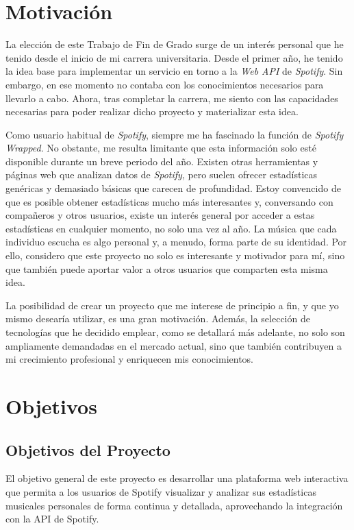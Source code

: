 \section{Motivación}

La elección de este Trabajo de Fin de Grado surge de un interés personal que he tenido desde el inicio de mi carrera universitaria. Desde el primer año, he tenido la idea base para implementar un servicio en torno a la \textit{Web API} de \textit{Spotify}. Sin embargo, en ese momento no contaba con los conocimientos necesarios para llevarlo a cabo. Ahora, tras completar la carrera, me siento con las capacidades necesarias para poder realizar dicho proyecto y materializar esta idea.

Como usuario habitual de \textit{Spotify}, siempre me ha fascinado la función de \textit{Spotify Wrapped}. No obstante, me resulta limitante que esta información solo esté disponible durante un breve periodo del año. Existen otras herramientas y páginas web que analizan datos de \textit{Spotify}, pero suelen ofrecer estadísticas genéricas y demasiado básicas que carecen de profundidad. Estoy convencido de que es posible obtener estadísticas mucho más interesantes y, conversando con compañeros y otros usuarios, existe un interés general por acceder a estas estadísticas en cualquier momento, no solo una vez al año. La música que cada individuo escucha es algo personal y, a menudo, forma parte de su identidad. Por ello, considero que este proyecto no solo es interesante y motivador para mí, sino que también puede aportar valor a otros usuarios que comparten esta misma idea.

La posibilidad de crear un proyecto que me interese de principio a fin, y que yo mismo desearía utilizar, es una gran motivación. Además, la selección de tecnologías que he decidido emplear, como se detallará más adelante, no solo son ampliamente demandadas en el mercado actual, sino que también contribuyen a mi crecimiento profesional y enriquecen mis conocimientos.

\section{Objetivos}

\subsection{Objetivos del Proyecto}

El objetivo general de este proyecto es desarrollar una plataforma web interactiva que permita a los usuarios de Spotify visualizar y analizar sus estadísticas musicales personales de forma continua y detallada, aprovechando la integración con la API de Spotify.

